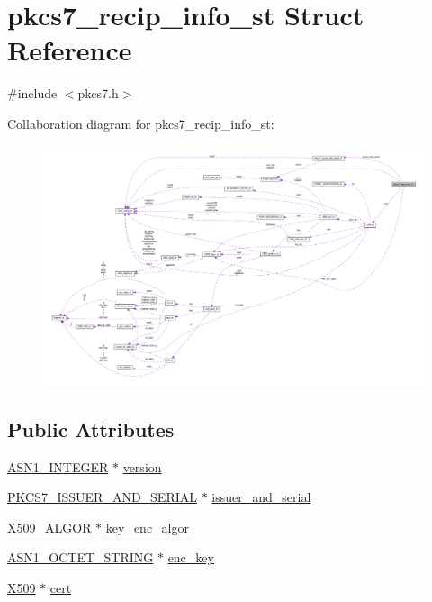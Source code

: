 \hypertarget{structpkcs7__recip__info__st}{}\section{pkcs7\+\_\+recip\+\_\+info\+\_\+st Struct Reference}
\label{structpkcs7__recip__info__st}


{\ttfamily \#include $<$pkcs7.\+h$>$}



Collaboration diagram for pkcs7\+\_\+recip\+\_\+info\+\_\+st\+:
\nopagebreak
\begin{figure}[H]
\begin{center}
\leavevmode
\includegraphics[width=350pt]{structpkcs7__recip__info__st__coll__graph}
\end{center}
\end{figure}
\subsection*{Public Attributes}
\begin{DoxyCompactItemize}
\item 
\hyperlink{ossl__typ_8h_af4335399bf9774cb410a5e93de65998b}{A\+S\+N1\+\_\+\+I\+N\+T\+E\+G\+ER} $\ast$ \hyperlink{structpkcs7__recip__info__st_a2dab371fc11bb2b2a31c8d6ae805b7d4}{version}
\item 
\hyperlink{pkcs7_8h_a3f5400dcd95708494b81eaae75743fcf}{P\+K\+C\+S7\+\_\+\+I\+S\+S\+U\+E\+R\+\_\+\+A\+N\+D\+\_\+\+S\+E\+R\+I\+AL} $\ast$ \hyperlink{structpkcs7__recip__info__st_a518df74b0610022385c23e30d659c003}{issuer\+\_\+and\+\_\+serial}
\item 
\hyperlink{ossl__typ_8h_aa2b6185e6254f36f709cd6577fb5022e}{X509\+\_\+\+A\+L\+G\+OR} $\ast$ \hyperlink{structpkcs7__recip__info__st_ad337ba9cf15d47888dfff734116dbed5}{key\+\_\+enc\+\_\+algor}
\item 
\hyperlink{ossl__typ_8h_afbd05e94e0f0430a2b729473efec88c1}{A\+S\+N1\+\_\+\+O\+C\+T\+E\+T\+\_\+\+S\+T\+R\+I\+NG} $\ast$ \hyperlink{structpkcs7__recip__info__st_a1dd5082129a2141e6a6ea4accc3ec700}{enc\+\_\+key}
\item 
\hyperlink{ossl__typ_8h_a4f666bde6518f95deb3050c54b408416}{X509} $\ast$ \hyperlink{structpkcs7__recip__info__st_a6be787ca74a954b3bb37d84d46aa9418}{cert}
\end{DoxyCompactItemize}


